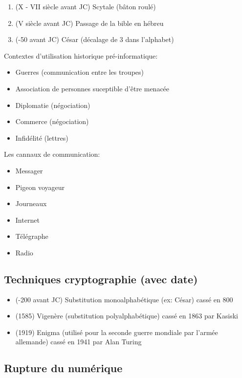 \documentclass[a4paper, 12pt]{article}
\begin{document}
\begin{exemple}
    \begin{enumerate}
        \item (X - VII siècle avant JC) Scytale (bâton roulé)
        \item (V siècle avant JC) Passage de la bible en hébreu
        \item (-50 avant JC) César (décalage de 3 dans l'alphabet)
    \end{enumerate}
\end{exemple}

Contextes d'utilisation historique pré-informatique:
\begin{itemize}
    \item Guerres (communication entre les troupes)
    \item Association de personnes suceptible d'être menacée
    \item Diplomatie (négociation)
    \item Commerce (négociation)
    \item Infidélité (lettres)
\end{itemize}

Les cannaux de communication:
\begin{itemize}
    \item Messager
    \item Pigeon voyageur
    \item Journeaux
    \item Internet
    \item Télégraphe
    \item Radio
\end{itemize}

\subsection{Techniques cryptographie (avec date)}

\begin{itemize}
    \item (-200 avant JC) Substitution monoalphabétique (ex: César)\n
    cassé en 800
    \item (1585) Vigenère (substitution polyalphabétique)\n
    cassé en 1863 par Kasiski
    \item (1919) Enigma (utilisé pour la seconde guerre mondiale par l'armée allemande)\n
    cassé en 1941 par Alan Turing
\end{itemize}

\subsection{Rupture du numérique}
\end{document}
